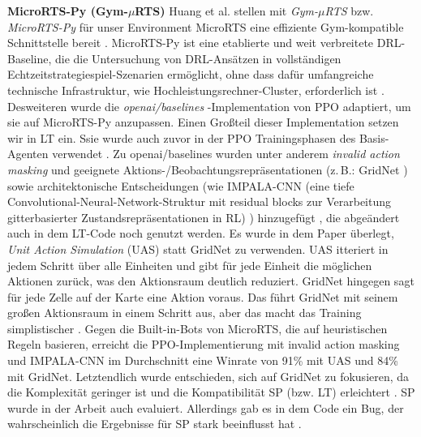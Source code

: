 \documentclass[10pt,twocolumn,letterpaper]{article}
\begin{document}
\noindent\textbf{MicroRTS-Py (Gym-$\mu$RTS)}
Huang et al. stellen mit \emph{Gym-$\mu$RTS} bzw. \emph{MicroRTS-Py} für unser Environment MicroRTS \cite{Ontanon2013CombinatorialBandit} eine effiziente Gym-kompatible Schnittstelle bereit \cite{huang2021gym}. 
MicroRTS-Py ist eine etablierte und weit verbreitete DRL-Baseline, die die Untersuchung von DRL-Ansätzen in vollständigen Echtzeitstrategiespiel-Szenarien ermöglicht, ohne dass dafür umfangreiche technische Infrastruktur, wie Hochleistungsrechner-Cluster, erforderlich ist \cite{huang2021gym}. 
Desweiteren wurde die \emph{openai/baselines} \cite{baselines} -Implementation von PPO adaptiert, um sie auf MicroRTS-Py anzupassen. 
Einen Großteil dieser Implementation setzen wir in LT ein. Ssie wurde auch zuvor in der PPO Trainingsphasen des Basis-Agenten verwendet \cite{huft2023microrts}.
Zu openai/baselines wurden unter anderem \emph{invalid action masking} und geeignete Aktions-/Beobachtungsrepräsentationen (z.\,B.: GridNet \cite{pmlr-v97-han19a}) sowie architektonische Entscheidungen (wie IMPALA-CNN (eine tiefe Convolutional-Neural-Network-Struktur mit residual blocks zur Verarbeitung gitterbasierter Zustandsrepräsentationen in RL) \cite{espeholt2018impala}) hinzugefügt \cite{huang2021gym}, die abgeändert auch in dem LT-Code noch genutzt werden.
Es wurde in dem Paper überlegt, \emph{Unit Action Simulation} (UAS) statt GridNet zu verwenden. UAS itteriert in jedem Schritt über alle Einheiten und gibt für jede Einheit die möglichen Aktionen zurück, was den Aktionsraum deutlich reduziert.
GridNet hingegen sagt für jede Zelle auf der Karte eine Aktion voraus. Das führt GridNet mit seinem großen Aktionsraum in einem Schritt aus, aber das macht das Training simplistischer \cite{huang2021gym, pmlr-v97-han19a}.
Gegen die Built-in-Bots von MicroRTS, die auf heuristischen Regeln basieren, erreicht die PPO-Implementierung mit invalid action masking und IMPALA-CNN im Durchschnitt eine Winrate von 91\% mit UAS und 84\% mit GridNet.
Letztendlich wurde entschieden, sich auf GridNet zu fokusieren, da die Komplexität geringer ist und die Kompatibilität SP (bzw. LT) erleichtert \cite{huang2021gym}.
SP wurde in der Arbeit auch evaluiert. Allerdings gab es in dem Code ein Bug, der wahrscheinlich die Ergebnisse für SP stark beeinflusst hat \cite{goodfriend2024raisocketai}.
\vspace{10pt}
\end{document}
